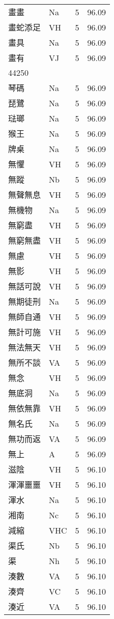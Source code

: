 \documentclass[twocolumn]{book}
\begin{document}
\begin{supertabular}{llrr}
畫畫 & Na & 5 &  96.09\\
畫蛇添足 & VH & 5 &  96.09\\
畫具 & Na & 5 &  96.09\\
畫有 & VJ & 5 &  96.09\\
44250\\
琴碼 & Na & 5 &  96.09\\
琵鷺 & Na & 5 &  96.09\\
琺瑯 & Na & 5 &  96.09\\
猴王 & Na & 5 &  96.09\\
牌桌 & Na & 5 &  96.09\\
無懼 & VH & 5 &  96.09\\
無蹤 & Nb & 5 &  96.09\\
無聲無息 & VH & 5 &  96.09\\
無機物 & Na & 5 &  96.09\\
無窮盡 & VH & 5 &  96.09\\
無窮無盡 & VH & 5 &  96.09\\
無慮 & VH & 5 &  96.09\\
無影 & VH & 5 &  96.09\\
無話可說 & VH & 5 &  96.09\\
無期徒刑 & Na & 5 &  96.09\\
無師自通 & VH & 5 &  96.09\\
無計可施 & VH & 5 &  96.09\\
無法無天 & VH & 5 &  96.09\\
無所不談 & VA & 5 &  96.09\\
無念 & VH & 5 &  96.09\\
無底洞 & Na & 5 &  96.09\\
無依無靠 & VH & 5 &  96.09\\
無名氏 & Na & 5 &  96.09\\
無功而返 & VA & 5 &  96.09\\
無上 & A & 5 &  96.09\\
滋陰 & VH & 5 &  96.10\\
渾渾噩噩 & VH & 5 &  96.10\\
渾水 & Na & 5 &  96.10\\
湘南 & Nc & 5 &  96.10\\
減縮 & VHC & 5 &  96.10\\
渠氏 & Nb & 5 &  96.10\\
渠 & Nh & 5 &  96.10\\
湊數 & VA & 5 &  96.10\\
湊齊 & VC & 5 &  96.10\\
湊近 & VA & 5 &  96.10\\

\end{supertabular}
\end{document}
